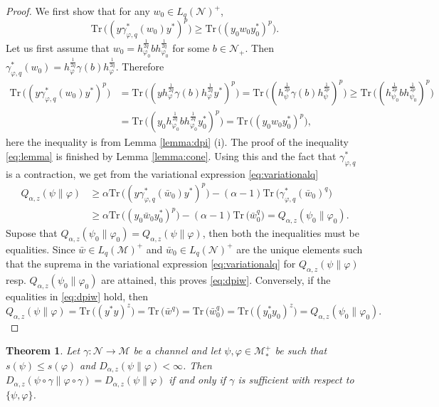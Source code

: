 \documentclass[12pt]{article}
\newtheorem{theorem}{Theorem}[section]
\theoremstyle{definition}
\theoremstyle{remark}
\numberwithin{equation}{section}
\def\Me{\mathcal M}
\def\Ne{\mathcal N}
\def \Tr{\mathrm{Tr}\,}
\def\ffi{\varphi}
\begin{document}
\begin{proof} We first show that  for any $w_0\in L_q(\Ne)^+$,
\begin{equation}\label{eq:lemma}
\Tr\bigl((y\gamma^*_{\ffi,q}(w_0)y^*)^p\bigr)\ge
\Tr \bigl((y_0w_0y_0^*)^p\bigr).
\end{equation}
Let us first assume that
$w_0=h_{\varphi_0}^{\frac1{2q}}bh_{\varphi_0}^{\frac1{2q}}$ for some $b\in \Ne_+$. Then 
$\gamma^*_{\varphi,q}(w_0)=h_{\varphi}^{\frac1{2q}}\gamma(b)h_{\varphi}^{\frac1{2q}}$.
Therefore
\begin{align*}
\Tr\bigl((y\gamma^*_{\varphi,q}(w_0)y^*)^p\bigr)&=\Tr\bigl((yh_{\varphi}^{\frac1{2q}}\gamma(b)h_{\varphi}^{\frac1{2q}}y^*)^p\bigr)=
\Tr\bigl((h_\psi^{\frac1{2p}}\gamma(b)h_\psi^{\frac1{2p}})^p\bigr)\ge
\Tr\bigl((h_{\psi_0}^{\frac1{2p}}bh_{\psi_0}^{\frac1{2p}})^p\bigr)\\
&=
\Tr\bigl((y_0h_{\varphi_0}^{\frac1{2q}}bh_{\varphi_0}^{\frac1{2q}}y_0^*)^p\bigr)=\Tr\bigl((y_0w_0y_0^*)^p\bigr),
\end{align*}
here the inequality is from Lemma \ref{lemma:dpi} (i). The proof of the inequality
\eqref{eq:lemma} is  finished  by Lemma \ref{lemma:cone}.
Using this and the fact that $\gamma^*_{\ffi,q}$ is a contraction, we get from the variational expression \eqref{eq:variationalq}
\begin{align*}
Q_{\alpha,z}(\psi\|\varphi)&\ge \alpha\Tr\bigl((y\gamma^*_{\varphi,q}(\bar
w_0)y^*)^p\bigr)-(\alpha-1)\Tr
\bigl(\gamma^*_{\varphi,q}(\bar w_0)^q\bigr)\\
&\ge \alpha\Tr\bigr((y_0\bar w_0 y_0^*)^p\bigr)-(\alpha-1)\Tr \bigl(\bar
w_0^q\bigr)=Q_{\alpha,z}(\psi_0\|\varphi_0).
\end{align*}
Supose that $Q_{\alpha,z}(\psi_0\|\varphi_0)=Q_{\alpha,z}(\psi\|\varphi)$, then both the
inequalities must be equalities. Since $\bar
w\in L_q(\Me)^+$ and $\bar w_0\in L_q(\Ne)^+$ are the unique elements such that the suprema
in the variational expression \eqref{eq:variationalq} for $Q_{\alpha,z}(\psi\|\varphi)$ resp.
$Q_{\alpha,z}(\psi_0\|\varphi_0)$ are attained, this proves \eqref{eq:dpiw}. Conversely,
if the equalities in \eqref{eq:dpiw} hold, then
\[
Q_{\alpha,z}(\psi\|\ffi)=\Tr \bigl((y^*y)^z\bigr)=\Tr\bigl(\bar
w^q\bigr)=\Tr\bigl(\bar w_0^q\bigr)=\Tr \bigl((y_0^*y_0)^z\bigr)=Q_{\alpha,z}(\psi_0\|\ffi_0).
\]



\end{proof}


\begin{theorem}\label{thm:suffge1} Let $\gamma:\Ne\to \Me$ be a channel and let $\psi,\varphi\in \Me_*^+$ be
such that 
$s(\psi)\le s(\ffi)$ and 
$D_{\alpha,z}(\psi\|\varphi)<\infty$. Then
$D_{\alpha,z}(\psi\circ\gamma\|\ffi\circ\gamma)=D_{\alpha,z}(\psi\|\varphi)$ if and only if
$\gamma$ is sufficient with respect to $\{\psi,\ffi\}$.

\end{theorem}
\end{document}
